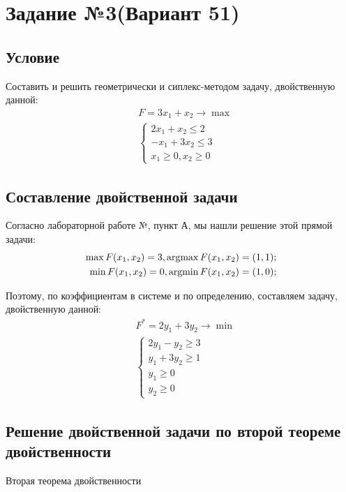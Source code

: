 \section{Задание №3(Вариант 51)}
\subsection{Условие}

Составить и решить геометрически и сиплекс-методом задачу, двойственную данной:
\begin{align*}
    &F = 3x_1 + x_2 \to \max\\
    &\begin{cases}
        2x_1 + x_2 \leq 2\\
        -x_1 + 3x_2 \leq 3\\
        x_1 \geq 0, x_2 \geq 0
    \end{cases}
\end{align*}

\subsection{Составление двойственной задачи}
Согласно лабораторной работе №\pageref{01-lab-a}, пункт А, мы нашли решение этой прямой задачи:
\begin{align*}
    \max F(x_1, x_2) = 3, \operatorname*{argmax} F(x_1, x_2) = (1, 1);\\
    \min F(x_1, x_2) = 0, \operatorname*{argmin} F(x_1, x_2) = (1, 0);
\end{align*} 

Поэтому, по коэффициентам в системе и по определению, составляем задачу, двойственную данной:
\begin{align*}
    &F^{*} = 2y_1 + 3y_2 \to \min\\
    &\begin{cases}
        2y_1 - y_2 \geq 3\\
        y_1 + 3y_2 \geq 1\\
        y_1 \geq 0\\
        y_2 \geq 0
    \end{cases}
\end{align*}

\subsection{Решение двойственной задачи по второй теореме двойственности}

\begin{theorem}{Вторая теорема двойственности}\end{theorem}

